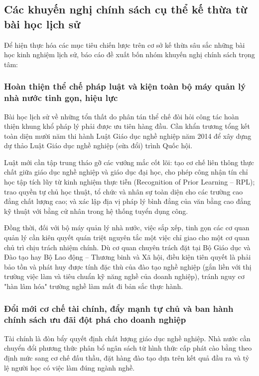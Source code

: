 \subsection{Các khuyến nghị chính sách cụ thể kế thừa từ bài học lịch sử}

Để hiện thực hóa các mục tiêu chiến lược trên cơ sở kế thừa sâu sắc những bài học kinh nghiệm lịch sử, báo cáo đề xuất bốn nhóm khuyến nghị chính sách trọng tâm:

\subsubsection{Hoàn thiện thể chế pháp luật và kiện toàn bộ máy quản lý nhà nước tinh gọn, hiệu lực}

Bài học lịch sử về những tổn thất do phân tán thể chế đòi hỏi công tác hoàn thiện khung khổ pháp lý phải được ưu tiên hàng đầu. Cần khẩn trương tổng kết toàn diện mười năm thi hành Luật Giáo dục nghề nghiệp năm 2014 để xây dựng dự thảo Luật Giáo dục nghề nghiệp (sửa đổi) trình Quốc hội. 

Luật mới cần tập trung tháo gỡ các vướng mắc cốt lõi: tạo cơ chế liên thông thực chất giữa giáo dục nghề nghiệp và giáo dục đại học, cho phép công nhận tín chỉ học tập tích lũy từ kinh nghiệm thực tiễn (Recognition of Prior Learning -- RPL); trao quyền tự chủ học thuật, tổ chức và nhân sự toàn diện cho các trường cao đẳng chất lượng cao; và xác lập địa vị pháp lý bình đẳng của văn bằng cao đẳng kỹ thuật với bằng cử nhân trong hệ thống tuyển dụng công.

Đồng thời, đối với bộ máy quản lý nhà nước, việc sắp xếp, tinh gọn các cơ quan quản lý cần kiên quyết quán triệt nguyên tắc một việc chỉ giao cho một cơ quan chủ trì chịu trách nhiệm chính. Dù cơ quan chuyên trách đặt tại Bộ Giáo dục và Đào tạo hay Bộ Lao động -- Thương binh và Xã hội, điều kiện tiên quyết là phải bảo tồn và phát huy được tính đặc thù của đào tạo nghề nghiệp (gắn liền với thị trường việc làm và tiêu chuẩn kỹ năng nghề của doanh nghiệp), tránh nguy cơ "hàn lâm hóa" trường nghề làm mất đi bản sắc thực hành.

\subsubsection{Đổi mới cơ chế tài chính, đẩy mạnh tự chủ và ban hành chính sách ưu đãi đột phá cho doanh nghiệp}

Tài chính là đòn bẩy quyết định chất lượng giáo dục nghề nghiệp. Nhà nước cần chuyển đổi phương thức phân bổ ngân sách từ hình thức cấp phát cào bằng theo định mức sang cơ chế đấu thầu, đặt hàng đào tạo dựa trên kết quả đầu ra và tỷ lệ người học có việc làm đúng ngành nghề. 

